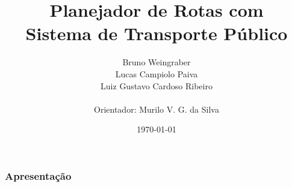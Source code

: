 \documentclass{beamer}
\title{Planejador de Rotas com \\ Sistema de Transporte Público}
\author{Bruno Weingraber \\ Lucas Campiolo Paiva \\ Luiz Gustavo Cardoso Ribeiro \\ ~ \\ Orientador: Murilo V. G. da Silva}
\institute{Universidade Tecnológica Federal do Paraná}
\date{\today}
\begin{document}
\frame{\titlepage}

\frame
{
\frametitle{Apresentação}
\setcounter{tocdepth}{1}
\tableofcontents
}








\end{document}
